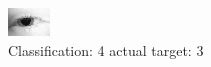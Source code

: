 \begin{figure}[h!]
\begin{center}
\includegraphics[width=0.60\columnwidth]{figures/ID166_class_4_target_3.png}
\end{center}
\caption{ Classification: 4 actual target: 3}
\label{fig:ID166_class_4_target_3}
\end{figure}

